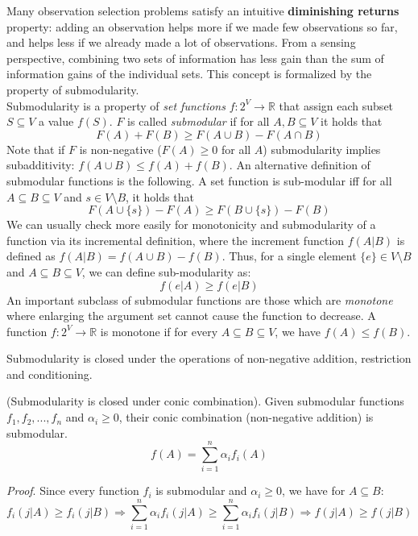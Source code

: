 Many observation selection problems satisfy an intuitive \textbf{diminishing returns} property: adding an observation helps more if we made few observations so far, and helps less if we already made a lot of observations. From a sensing perspective, combining two sets of information has less gain than the sum of information gains of the individual sets. This concept is formalized by the property of submodularity.\\

Submodularity is a property of \textit{set functions} $f: 2^{V} \rightarrow \mathbb{R}$ that assign each subset $S \subseteq V$ a value $f(S)$. $F$ is called \textit{submodular} if for all $A, B \subseteq V$ it holds that
\begin{equation}
    F(A) + F(B) \geq F(A \cup B) - F(A \cap B)
\end{equation}
Note that if $F$ is non-negative ($F(A)\geq 0$ for all $A$) submodularity implies subadditivity: $f(A \cup B) \leq f(A) + f(B)$. An alternative definition of submodular functions is the following. A set function is sub-modular iff for all $A \subseteq B \subseteq V$ and $s \in V \setminus B$, it holds that
\begin{equation}
    F(A \cup \{s\}) - F(A) \geq F(B \cup \{s\}) - F(B) 
\end{equation}
We can usually check more easily for monotonicity and submodularity of a function via its incremental definition, where the increment function $f(A|B)$ is defined as $f(A|B) = f(A \cup B) - f(B)$. Thus, for a single element $\{e\} \in V \setminus B$ and $A \subseteq B \subseteq V$, we can define sub-modularity as:
\begin{equation}
    f(e|A) \geq f(e|B)
\end{equation}
An important subclass of submodular functions are those which are \textit{monotone} where enlarging the argument set cannot cause the function to decrease. A function $f: 2^{V}\rightarrow \mathbb{R}$ is monotone if for every $A \subseteq B \subseteq V$, we have $f(A) \leq f(B)$.

Submodularity is closed under the operations of non-negative addition, restriction and conditioning. 
\begin{theorem}
(Submodularity is closed under conic combination). Given submodular functions $f_1,f_2,...,f_n$ and $\alpha_i \geq 0$, their conic combination (non-negative addition) is submodular.
\begin{equation}
    f(A) = \sum_{i=1}^{n} \alpha_i f_i(A)
\end{equation}
\end{theorem}
\textit{Proof}. Since every function $f_i$ is submodular and $\alpha_i \geq 0$, we have for $A \subseteq B$:
\begin{equation}
    f_i(j|A) \geq f_i(j|B) \Rightarrow \sum_{i=1}^{n}\alpha_i f_i(j|A)\geq \sum_{i=1}^{n}\alpha_i f_i(j|B) \Rightarrow f(j|A) \geq f(j|B)
\end{equation}

